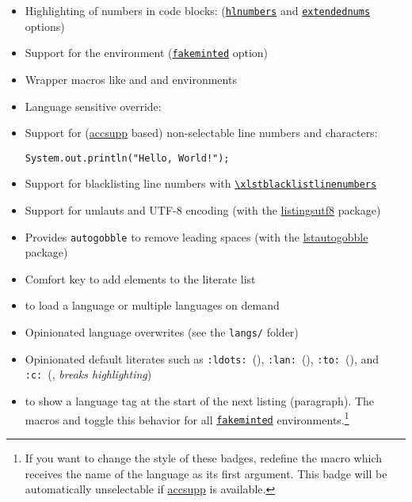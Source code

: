 \documentclass[10pt,DIV=12]{scrartcl}
\let\T\texttt
\def\argref#1#2{\hyperref[arg:#1]{\T{#2}}}
\def\cmdref#1{\hyperref[arg:#1]{\T{\xlstGetStyle{command}\textbackslash #1}}}
\begin{document}
\begin{itemize}[nosep,itemsep=2pt,leftmargin=*]
    \item Highlighting of numbers in code blocks: \; (\argref{hlnumbers}{hlnumbers} and \argref{extendednums}{extendednums} options)
    \item Support for the  environment (\argref{fakeminted}{fakeminted} option)
    \item Wrapper macros like  and  and environments 
    \item Language sensitive override: 
    \item Support for (\href{https://ctan.org/pkg/accsupp}{accsupp} based) non-selectable line numbers and characters:
\begin{verbatim}
System.out.println("Hello, World!");
\end{verbatim}
    \item Support for blacklisting line numbers with \cmdref{xlstblacklistlinenumbers}
    \item Support for umlauts and UTF-8 encoding (with the \href{https://ctan.org/pkg/listingsutf8
    }{listingsutf8} package)
    \item Provides \texttt{autogobble} to remove leading spaces (with the \href{https://ctan.org/pkg/lstautogobble}{lstautogobble} package)
    \item Comfort key  to add elements to the literate list
    \item {} to load a language or multiple languages on demand
    \item Opinionated language overwrites (see the \T{langs/} folder)
    \item Opinionated default literates such as \T{:ldots:}~(), \T{:lan:}~(), \T{:to:}~(), and \T{:c:}~(, \textit{breaks highlighting})
    \item {} to show a language tag at the start of the next listing (paragraph). The macros \blatex{\\xlstmintedwithlangbadge} and \blatex{\\xlstmintedwithoutlangbadge} toggle this behavior for all \argref{fakeminted}{fakeminted} environments.\footnote{If you want to change the style of these badges, redefine the \blatex{\\xlstlangbadgestyle} macro which receives the name of the language as its first argument. This badge will be automatically unselectable if \href{https://ctan.org/pkg/accsupp}{accsupp} is available.}
\end{itemize}
\end{document}
